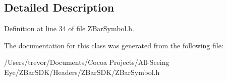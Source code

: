 \subsection{Detailed Description}


Definition at line 34 of file ZBarSymbol.h.



The documentation for this class was generated from the following file:\begin{DoxyCompactItemize}
\item 
/Users/trevor/Documents/Cocoa Projects/All-\/Seeing Eye/ZBarSDK/Headers/ZBarSDK/ZBarSymbol.h\end{DoxyCompactItemize}
